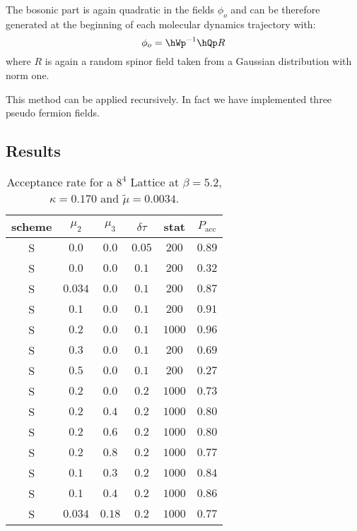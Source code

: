 The bosonic part is again quadratic in the fields $\phi_o$ and can be
therefore generated at the beginning of each molecular dynamics
trajectory with:
\begin{equation}
  \label{eq:mt8}
  \phi_o = \hWp^{-1}\hQp R
\end{equation}
where $R$ is again a random spinor field taken from a Gaussian
distribution with norm one.

This method can be applied recursively. In fact we have implemented
three pseudo fermion fields.

\subsection{Results}

\begin{table}[htbp]
  \centering
  \begin{tabular}{|c|c|c|c|c|c|}
    \hline
    scheme & $\mu_2$ & $\mu_3$ & $\delta\tau$ & stat & $P_{\textrm{acc}}$ \\
    \hline\hline
    S & $0.0$ & $0.0$ & $0.05$ & $200$ & $0.89$ \\
    \hline
    S & $0.0$ & $0.0$ & $0.1$ & $200$ & $0.32$ \\
    S & $0.034$ & $0.0$ & $0.1$ & $200$ & $0.87$ \\
    S & $0.1$ & $0.0$ & $0.1$ & $200$ & $0.91$ \\
    S & $0.2$ & $0.0$ & $0.1$ & $1000$ & $0.96$ \\
    S & $0.3$ & $0.0$ & $0.1$ & $200$ & $0.69$ \\
    S & $0.5$ & $0.0$ & $0.1$ & $200$ & $0.27$ \\
    \hline
    S & $0.2$ & $0.0$ & $0.2$ & $1000$ & $0.73$ \\
    S & $0.2$ & $0.4$ & $0.2$ & $1000$ & $0.80$\\
    S & $0.2$ & $0.6$ & $0.2$ & $1000$ & $0.80$ \\
    S & $0.2$ & $0.8$ & $0.2$ & $1000$ & $0.77$ \\
    S & $0.1$ & $0.3$ & $0.2$ & $1000$ & $0.84$ \\
    S & $0.1$ & $0.4$ & $0.2$ & $1000$ & $0.86$ \\
    S & $0.034$ & $0.18$ & $0.2$ & $1000$ & $0.77$ \\
    \hline
  \end{tabular}
  \caption{Acceptance rate for a $8^4$ Lattice at $\beta=5.2$, $\kappa=0.170$ and $\tilde\mu = 0.0034$.}
  \label{tab:resmt}
\end{table}

